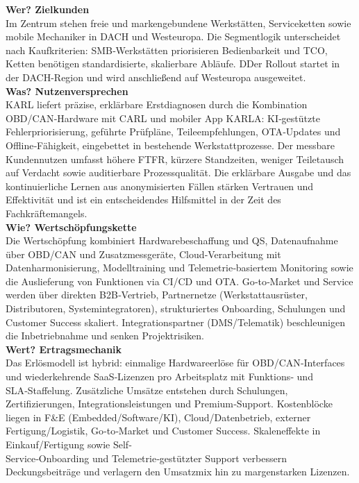 \textbf{Wer? Zielkunden}\\
Im Zentrum stehen freie und markengebundene Werkstätten, Serviceketten sowie mobile Mechaniker in DACH und Westeuropa. Die Segmentlogik unterscheidet nach Kaufkriterien: \ac{SMB}‑Werkstätten priorisieren Bedienbarkeit und TCO, Ketten benötigen standardisierte, skalierbare Abläufe. DDer Rollout startet in der DACH-Region und wird anschließend auf Westeuropa ausgeweitet. \\

\textbf{Was? Nutzenversprechen}\\
KARL liefert präzise, erklärbare Erstdiagnosen durch die Kombination OBD/CAN‑Hardware mit \ac{CARL} und mobiler App \ac{KARLA}: \ac{KI}‑gestützte Fehlerpriorisierung, geführte Prüfpläne, Teileempfehlungen, \ac{OTA}‑Updates und Offline‑Fähigkeit, eingebettet in bestehende Werkstattprozesse. Der messbare Kundennutzen umfasst höhere \ac{FTFR}, kürzere Standzeiten, weniger Teiletausch auf Verdacht sowie auditierbare Prozessqualität. Die erklärbare Ausgabe und das kontinuierliche Lernen aus anonymisierten Fällen stärken Vertrauen und Effektivität und ist ein entscheidendes Hilfsmittel in der Zeit des Fachkräftemangels. \\

\textbf{Wie? Wertschöpfungskette}\\
Die Wertschöpfung kombiniert Hardwarebeschaffung und QS, Datenaufnahme über OBD/CAN und Zusatzmessgeräte, Cloud‑Verarbeitung mit Datenharmonisierung, Modelltraining und Telemetrie‑basiertem Monitoring sowie die Auslieferung von Funktionen via \ac{CI/CD} und \ac{OTA}. Go‑to‑Market und Service werden über direkten \ac{B2B}‑Vertrieb, Partnernetze (Werkstattausrüster, Distributoren, Systemintegratoren), strukturiertes Onboarding, Schulungen und Customer Success skaliert. Integrationspartner (\ac{DMS}/Telematik) beschleunigen die Inbetriebnahme und senken Projektrisiken. \\

\textbf{Wert? Ertragsmechanik}\\
Das Erlösmodell ist hybrid: einmalige Hardwareerlöse für \ac{OBD}/\ac{CAN}‑Interfaces und wiederkehrende \ac{SaaS}‑Lizenzen pro Arbeitsplatz mit Funktions‑ und \ac{SLA}‑Staffelung. Zusätzliche Umsätze entstehen durch Schulungen, Zertifizierungen, Integrationsleistungen und Premium‑Support. Kostenblöcke liegen in F\&E (Embedded/Software/\ac{KI}), Cloud/Datenbetrieb, externer Fertigung/Logistik, Go‑to‑Market und Customer Success. Skaleneffekte in Einkauf/Fertigung sowie Self‑\\Service‑Onboarding und Telemetrie‑gestützter Support verbessern Deckungsbeiträge und verlagern den Umsatzmix hin zu margenstarken Lizenzen. \\

